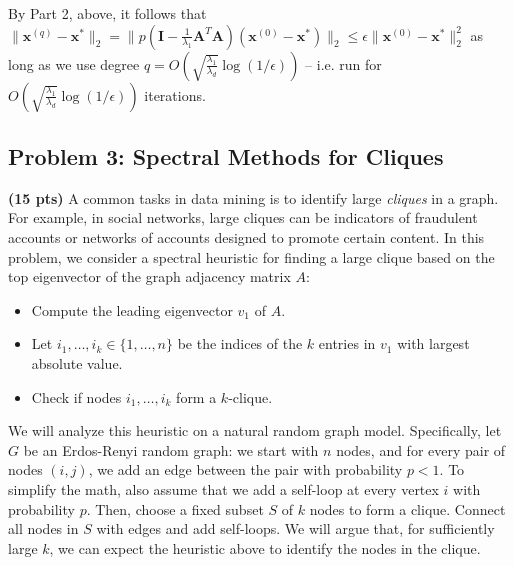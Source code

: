 \documentclass[10pt]{article}
\newcommand{\bv}[1]{\mathbf{#1}}
\begin{document}
By Part 2, above, it follows that $\|\bv{x}^{(q)} - \bv{x}^*\|_2 = \|p\left(\bv{I} - \frac{1}{\lambda_1}\bv{A}^T\bv{A}\right)(\bv{x}^{(0)} - \bv{x}^*)\|_2 \leq \epsilon \|\bv{x}^{(0)} - \bv{x}^*\|_2^2$ as long as we use degree $q = O(\sqrt{\frac{\lambda_1}{\lambda_d}} \log(1/\epsilon))$ -- i.e. run for $O(\sqrt{\frac{\lambda_1}{\lambda_d}} \log(1/\epsilon))$ iterations.

\subsection{Problem 3: Spectral Methods for Cliques} 
\textbf{(15 pts)} 
A common tasks in data mining is to identify large \emph{cliques} in a graph. For example, in social networks, large cliques can be indicators of fraudulent accounts or networks of accounts designed to promote certain content. In this problem, we consider a spectral heuristic for finding a large clique based on the top eigenvector of the graph adjacency matrix $A$: 
\begin{itemize}
	\item Compute the leading eigenvector $v_1$ of $A$. 
	\item Let $i_1, \ldots, i_k \in \{1, \ldots, n\}$ be the indices of the $k$ entries in $v_1$ with largest absolute value. 
	\item Check if nodes $i_1, \ldots, i_k$ form a $k$-clique.
\end{itemize}

We will analyze this heuristic on a natural random graph model. Specifically, let $G$ be an Erdos-Renyi random graph: we start with $n$ nodes, and for every pair of nodes $(i,j)$, we add an edge between the pair with probability $p < 1$. To simplify the math, also assume that we add a self-loop at every vertex $i$ with probability $p$. Then, choose a fixed subset $S$ of $k$ nodes to form a clique. Connect all nodes in $S$ with edges and add self-loops. We will argue that, for sufficiently large $k$, we can expect the heuristic above to identify the nodes in the clique. 
\end{document}
